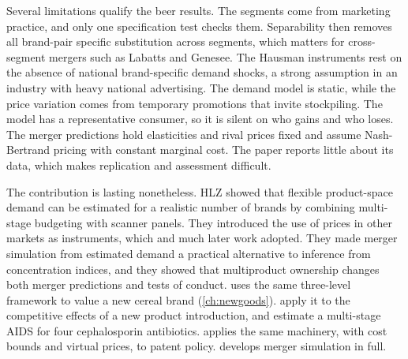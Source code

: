 Several limitations qualify the beer results. The segments come from marketing practice, and only one
specification test checks them. Separability then removes all brand-pair specific substitution across segments,
which matters for cross-segment mergers such as Labatts and Genesee. The Hausman instruments rest on the absence
of national brand-specific demand shocks, a strong assumption in an industry with heavy national advertising.
The demand model is static, while the price variation comes from temporary promotions that invite stockpiling.
The model has a representative consumer, so it is silent on who gains and who loses. The merger predictions hold
elasticities and rival prices fixed and assume Nash-Bertrand pricing with constant marginal cost. The paper
reports little about its data, which makes replication and assessment difficult.

The contribution is lasting nonetheless. HLZ showed that flexible product-space demand can be estimated for a
realistic number of brands by combining multi-stage budgeting with scanner panels. They introduced the use of
prices in other markets as instruments, which \citet{Nevo2001} and much later work adopted. They made merger
simulation from estimated demand a practical alternative to inference from concentration indices, and they
showed that multiproduct ownership changes both merger predictions and tests of conduct. \citet{Hausman1997} uses
the same three-level framework to value a new cereal brand (\cref{ch:newgoods}). \citet{HausmanLeonard2002} apply
it to the competitive effects of a new product introduction, and \citet{EllisonEtAl1997} estimate a multi-stage
AIDS for four cephalosporin antibiotics.  applies the same machinery, with cost bounds and
virtual prices, to patent policy.  develops merger simulation in full.


